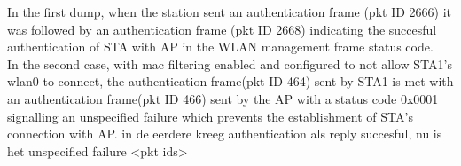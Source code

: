 In the first dump, when the station sent an authentication frame (pkt ID 2666) it was
followed by an authentication frame (pkt ID 2668) indicating the succesful authentication
of STA with AP in the WLAN management frame status code.\\
In the second case, with mac filtering enabled and configured to not allow STA1's wlan0 to connect,
the authentication frame(pkt ID 464) sent by STA1 is met with an authentication frame(pkt ID 466) sent by the AP
with a status code 0x0001 signalling an unspecified failure which prevents the establishment of STA's connection with AP.
in de eerdere kreeg authentication als reply succesful, nu is het unspecified failure
<pkt ids>
